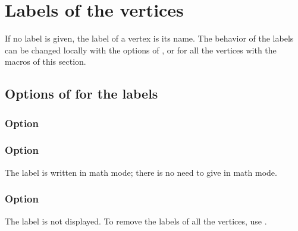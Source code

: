 \section{Labels of the vertices}
If no label is given, the label of a vertex is its name. The behavior of the
labels can be changed locally with the options of , or for
all the vertices with the macros of this section.

\subsection{Options of  for the labels}

\subsubsection{Option }
\begin{tkzexample}[latex=7cm,small]
\end{tkzexample}

\subsubsection{Option }
The label is written in math mode; there is no need to give  in
math mode.

\begin{tkzexample}[latex=7cm,small]
\end{tkzexample}

\subsubsection{Option }
The label is not displayed. To remove the labels of all the vertices, use
.

\begin{tkzexample}[latex=7cm,small]
\end{tkzexample}

